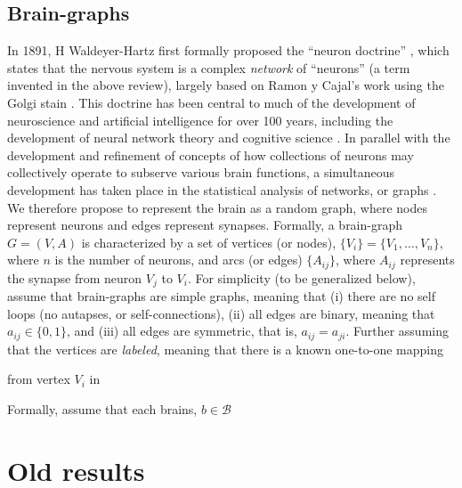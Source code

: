 \documentclass{article}
\providecommand{\mc}[1]{\mathcal{#1}}
\begin{document}
\subsection{Brain-graphs} %
\label{sub:brain_graphs}

In 1891, H Waldeyer-Hartz first formally proposed the ``neuron doctrine'' \cite{Waldeyer-Hartz1891}, which states that the nervous system is a complex \emph{network} of ``neurons'' (a term invented in the above review), largely based on Ramon y Cajal's work using the Golgi stain \cite{Finger01}.  This doctrine has been central to much of the development of neuroscience and artificial intelligence for over 100 years, including the development of neural network theory \cite{Bishop95} and cognitive science \cite{McClellandRumelhart86}.  In parallel with the development and refinement of concepts of how collections of neurons may collectively operate to subserve various brain functions, a simultaneous development has taken place in the statistical analysis of networks, or graphs \cite{Bollobas, otherbook}.  We therefore propose to represent the brain as a random graph, where nodes represent neurons and edges represent synapses.  Formally, a brain-graph $G=(V,A)$ is characterized by a set of vertices (or nodes), $\{V_i\} = \{V_1,\ldots, V_n\}$, where $n$ is the number of neurons, and arcs (or edges) $\{A_{ij}\}$, where $A_{ij}$ represents the synapse from neuron $V_j$ to $V_i$. For simplicity (to be generalized below), assume that brain-graphs are simple graphs, meaning that (i) there are no self loops (no autapses, or self-connections), (ii) all edges are binary, meaning that $a_{ij} \in \{0,1\}$, and (iii) all edges are symmetric, that is, $a_{ij}=a_{ji}$.  Further assuming that the vertices are \emph{labeled}, meaning that there is a known one-to-one mapping 

from vertex $V_i$ in 


Formally, assume that each brains, $b \in \mc{B}$



\section{Old results} %
\label{sec:old_results}
\end{document}
